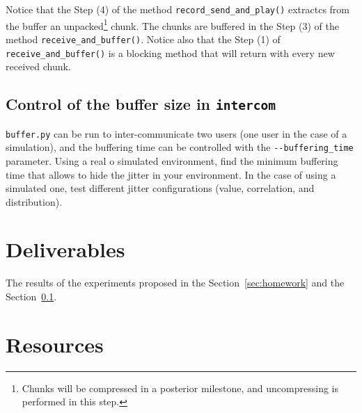 Notice that the Step (4) of the method \verb|record_send_and_play()|
extractcs from the buffer an unpacked\footnote{Chunks will be
compressed in a posterior milestone, and uncompressing is performed in
this step.} chunk. The chunks are buffered in the Step (3) of the
method \verb|receive_and_buffer()|. Notice also that the Step (1) of
\verb|receive_and_buffer()| is a blocking method that will return with
every new received chunk.


\subsection{Control of the buffer size in \texttt{intercom}}
\label{sec:homework2}
\verb|buffer.py| can be run to inter-communicate two users (one user
in the case of a simulation), and the buffering time can be controlled
with the \verb|--buffering_time| parameter. Using a real o simulated
environment, find the minimum buffering time that allows to hide the
jitter in your environment. In the case of using a simulated one, test
different jitter configurations (value, correlation, and
distribution).

\section{Deliverables}

The results of the experiments proposed in the
Section~\ref{sec:homework} and the Section~\ref{sec:homework2}.

\section{Resources}


